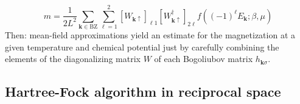 \begin{equation}\label{appeq:antiferromagnet-magnetization-self-consistence-finite-temperature}
	m = \frac{1}{2L^2} \sum_{\mathbf{k} \in \mathrm{BZ}} \sum_{\ell=1}^2 
	[
		W_{\mathbf{k}\uparrow}
	]_{\ell 1} [
		W_{\mathbf{k}\uparrow}^\dagger
	]_{2 \ell}
	f\left(
		(-1)^\ell E_\mathbf{k}; \beta,\mu
	\right)
\end{equation}
Then: mean-field approximations yield an estimate for the magnetization at a given temperature and chemical potential just by carefully combining the elements of the diagonalizing matrix $W$ of each Bogoliubov matrix $h_{\mathbf{k}\sigma}$.

\subsection{Hartree-Fock algorithm in reciprocal space}\label{appsubsec:hartree-fock-algorithm}


